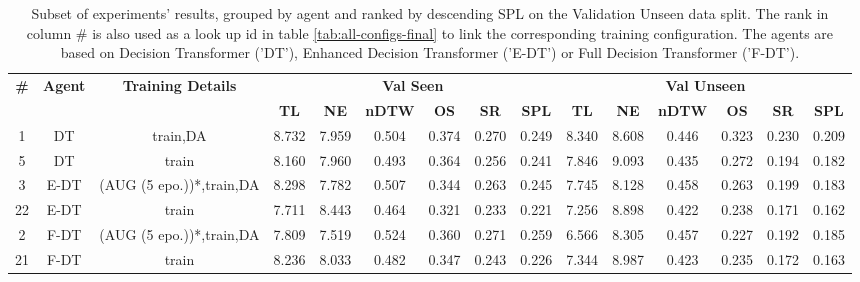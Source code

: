 \begin{table}
\centering
\caption{\label{tab:final}Subset of experiments' results, grouped by agent and ranked by descending SPL on the Validation Unseen data split. The rank in column \# is also used as a look up id in table \ref{tab:all-configs-final} to link the corresponding training configuration.     \newline The agents are based on Decision Transformer ('DT'), Enhanced Decision Transformer ('E-DT') or Full Decision Transformer ('F-DT').}
\begin{tabular}{@{\hskip3pt}c@{\hskip3pt}c@{\hskip3pt}c@{\hskip3pt}c@{\hskip3pt}c@{\hskip3pt}c@{\hskip3pt}c@{\hskip3pt}c@{\hskip3pt}c@{\hskip3pt}c@{\hskip3pt}c@{\hskip3pt}c@{\hskip3pt}c@{\hskip3pt}c@{\hskip3pt}c}
\toprule
\textbf{\#} & \textbf{Agent} & \textbf{Training Details} & \multicolumn{6}{c}{\textbf{Val Seen}} & \multicolumn{6}{c}{\textbf{Val Unseen}} \\
\cmidrule(l){4-9} \cmidrule(l){10-15} \textbf{~} &     \textbf{~} &                \textbf{~} &       \textbf{TL} & \textbf{NE} & \textbf{nDTW} & \textbf{OS} & \textbf{SR} & \textbf{SPL} &         \textbf{TL} & \textbf{NE} & \textbf{nDTW} & \textbf{OS} & \textbf{SR} & \textbf{SPL} \\
\midrule
          1 &             DT &                  train,DA &             8.732 &       7.959 &         0.504 &       0.374 &       0.270 &        0.249 &               8.340 &       8.608 &         0.446 &       0.323 &       0.230 &        0.209 \\
          5 &             DT &                     train &             8.160 &       7.960 &         0.493 &       0.364 &       0.256 &        0.241 &               7.846 &       9.093 &         0.435 &       0.272 &       0.194 &        0.182 \\
          3 &           E-DT &  (AUG (5 epo.))*,train,DA &             8.298 &       7.782 &         0.507 &       0.344 &       0.263 &        0.245 &               7.745 &       8.128 &         0.458 &       0.263 &       0.199 &        0.183 \\
         22 &           E-DT &                     train &             7.711 &       8.443 &         0.464 &       0.321 &       0.233 &        0.221 &               7.256 &       8.898 &         0.422 &       0.238 &       0.171 &        0.162 \\
          2 &           F-DT &  (AUG (5 epo.))*,train,DA &             7.809 &       7.519 &         0.524 &       0.360 &       0.271 &        0.259 &               6.566 &       8.305 &         0.457 &       0.227 &       0.192 &        0.185 \\
         21 &           F-DT &                     train &             8.236 &       8.033 &         0.482 &       0.347 &       0.243 &        0.226 &               7.344 &       8.987 &         0.423 &       0.235 &       0.172 &        0.163 \\
\bottomrule
\end{tabular}
\end{table}
